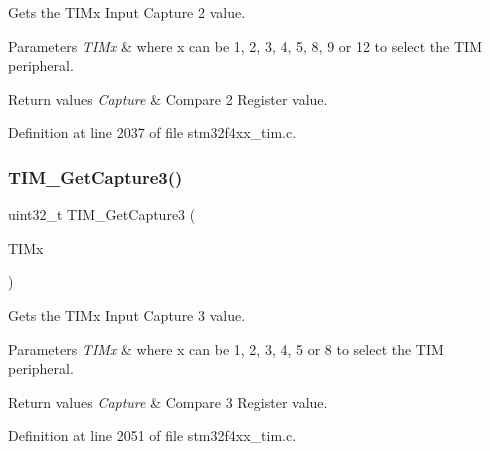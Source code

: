 Gets the T\+I\+Mx Input Capture 2 value. 


\begin{DoxyParams}{Parameters}
{\em T\+I\+Mx} & where x can be 1, 2, 3, 4, 5, 8, 9 or 12 to select the T\+IM peripheral. \\
\hline
\end{DoxyParams}

\begin{DoxyRetVals}{Return values}
{\em Capture} & Compare 2 Register value. \\
\hline
\end{DoxyRetVals}


Definition at line 2037 of file stm32f4xx\+\_\+tim.\+c.

\mbox{\label{group___t_i_m___group3_ga71ee9ce2c535ec0fb3fac5f9119221f7}} 
\subsubsection{\texorpdfstring{T\+I\+M\+\_\+\+Get\+Capture3()}{TIM\_GetCapture3()}}
{\footnotesize\ttfamily uint32\+\_\+t T\+I\+M\+\_\+\+Get\+Capture3 (\begin{DoxyParamCaption}\item[{\hyperlink{struct_t_i_m___type_def}{T\+I\+M\+\_\+\+Type\+Def} $\ast$}]{T\+I\+Mx }\end{DoxyParamCaption})}



Gets the T\+I\+Mx Input Capture 3 value. 


\begin{DoxyParams}{Parameters}
{\em T\+I\+Mx} & where x can be 1, 2, 3, 4, 5 or 8 to select the T\+IM peripheral. \\
\hline
\end{DoxyParams}

\begin{DoxyRetVals}{Return values}
{\em Capture} & Compare 3 Register value. \\
\hline
\end{DoxyRetVals}


Definition at line 2051 of file stm32f4xx\+\_\+tim.\+c.

\mbox{\label{group___t_i_m___group3_ga420b022cbc71ac603b5dd4922687abb1}} 
